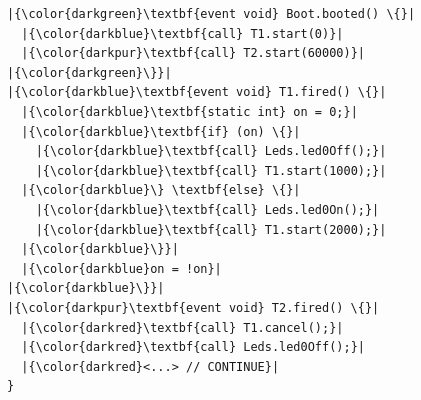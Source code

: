 \begin{figure}[!t]
\begin{minipage}[t]{0.50\linewidth}
\begin{lstlisting}[title=\emph{/* nesC */}]
|{\color{darkgreen}\textbf{event void} Boot.booted() \{}|
  |{\color{darkblue}\textbf{call} T1.start(0)}|
  |{\color{darkpur}\textbf{call} T2.start(60000)}|
|{\color{darkgreen}\}}|
|{\color{darkblue}\textbf{event void} T1.fired() \{}|
  |{\color{darkblue}\textbf{static int} on = 0;}|
  |{\color{darkblue}\textbf{if} (on) \{}|
    |{\color{darkblue}\textbf{call} Leds.led0Off();}|
    |{\color{darkblue}\textbf{call} T1.start(1000);}|
  |{\color{darkblue}\} \textbf{else} \{}|
    |{\color{darkblue}\textbf{call} Leds.led0On();}|
    |{\color{darkblue}\textbf{call} T1.start(2000);}|
  |{\color{darkblue}\}}|
  |{\color{darkblue}on = !on}|
|{\color{darkblue}\}}|
|{\color{darkpur}\textbf{event void} T2.fired() \{}|
  |{\color{darkred}\textbf{call} T1.cancel();}|
  |{\color{darkred}\textbf{call} Leds.led0Off();}|
  |{\color{darkred}<...> // CONTINUE}|
}


\end{lstlisting}
\end{minipage}
\end{figure}
